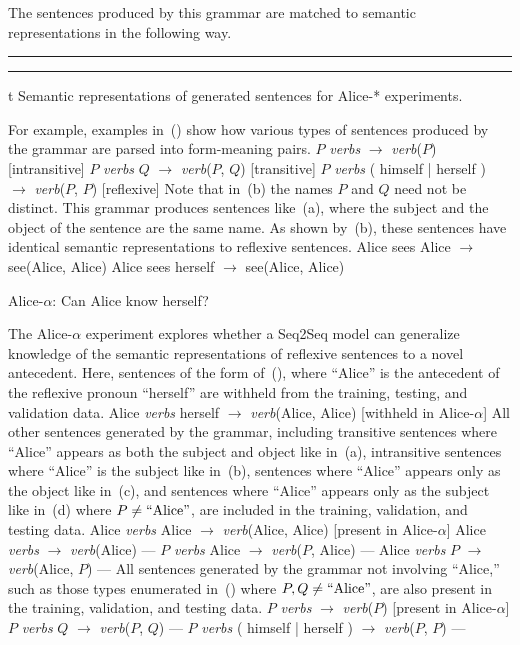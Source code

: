 The sentences produced by this grammar are matched to semantic representations
in the following way.

\par\nobreak\medskip
\hrule width 5.5in
\smallskip
{}
\smallskip
\hrule width 5.5in
\par\nobreak\medskip
\caption/t Semantic representations of generated sentences for Alice-* experiments.

For example, examples in~(\nextx) show how various types of sentences produced 
by the grammar are parsed into form-meaning pairs.
\pex
	\a $P$ {\em verbs} $\to$ {\em verb}($P$) \hfill [intransitive]
	\a $P$ {\em verbs} $Q$ $\to$ {\em verb}($P$, $Q$) \hfill [transitive]
	\a $P$ {\em verbs} ( himself | herself ) $\to$ {\em verb}($P$, $P$) \hfill [reflexive]
\xe
Note that in~(\lastx b) the names $P$ and $Q$ need not be distinct. This 
grammar produces sentences like~(\nextx a), where the subject and the object
of the sentence are the same name. As shown by~(\nextx b), these sentences have
identical semantic representations to reflexive sentences.
\pex
	\a Alice sees Alice $\to$ see(Alice, Alice)
	\a Alice sees herself $\to$ see(Alice, Alice)
\xe

\ssec Alice-$\alpha$: Can Alice know herself?

The Alice-$\alpha$ experiment explores whether a Seq2Seq model can generalize
knowledge of the semantic representations of reflexive sentences to a novel
antecedent. Here, sentences of the form of~(\nextx), where ``Alice'' is the
antecedent of the reflexive pronoun ``herself'' are withheld from the training,
testing, and validation data. 
	Alice {\em verbs} herself $\to$ {\em verb}(Alice, Alice) \hfill [withheld in Alice-$\alpha$]
\xe
All other sentences generated by the grammar, including transitive sentences 
where ``Alice'' appears as both the subject and object like in~(\nextx a),
intransitive sentences where ``Alice'' is the subject like in~(\nextx b), 
sentences where ``Alice'' appears only as the object like in~(\nextx c), and
sentences where ``Alice'' appears only as the subject like in~(\nextx d) where 
$P \not= \hbox{``Alice''}$, are included in the training, validation, and 
testing data.
	\a Alice {\em verbs} Alice $\to$ {\em verb}(Alice, Alice) \hfill [present in Alice-$\alpha$]
	\a Alice {\em verbs} $\to$ {\em verb}(Alice) \hfill ---
	\a $P$ {\em verbs} Alice $\to$ {\em verb}($P$, Alice) \hfill ---
	\a Alice {\em verbs} $P$ $\to$ {\em verb}(Alice, $P$) \hfill ---
\xe
All sentences generated by the grammar not involving ``Alice,'' such as those
types enumerated in~(\nextx) where $P,Q \not= \hbox{``Alice''}$, are also present in the training, validation, and
testing data.
\pex
	\a $P$ {\em verbs} $\to$ {\em verb}($P$) \hfill [present in Alice-$\alpha$]
	\a $P$ {\em verbs} $Q$ $\to$ {\em verb}($P$, $Q$) \hfill ---
	\a $P$ {\em verbs} ( himself | herself ) $\to$ {\em verb}($P$, $P$) \hfill ---
\xe

